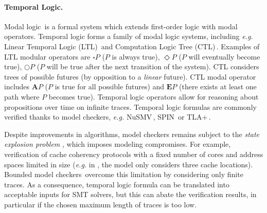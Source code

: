 
\paragraph{Temporal Logic.}
%
Modal logic\,\cite{chagrov1997modal} is a formal system which extends
first-order logic with modal operators.
%
Temporal logic forms a family of modal logic systems, including \emph{e.g.}
Linear Temporal Logic (LTL)\,\cite{sistla1985ltl} and Computation Logic Tree
(CTL)\,\cite{clarke1981ctl}.
%
Examples of LTL modular operators are \( \square P \) (\( P \) is always true),
\( \Diamond P \) (\( P \) will eventually become true), \( \bigcirc P \)
(\( P \) will be true after the next transition of the system).
%
CTL considers trees of possible futures (by opposition to a \emph{linear}
future).
%
CTL modal operator includes \( \mathbf{A} P \) (\( P \) is true for all possible
futures) and \( \mathbf{E} P \) (there exists at least one path where \( P \)
becomes true).
%
Temporal logic operators allow for reasoning about propositions over time on
infinite traces.
%
Temporal logic formulas are commonly verified thanks to model checkers,
\emph{e.g.}  NuSMV\,\cite{cimatti2002nusmv}, SPIN\,\cite{holzmann1997spin} or
TLA+\,\cite{lamport2002tla}.

Despite improvements in algorithms, model checkers remains subject to the
\emph{state explosion problem} , which imposes modeling compromises. For example, verification of cache coherency protocols with a fixed number of cores and
address spaces limited in size (\emph{e.g.} in \cite{lie2003xom}, the model only
considers three cache locations). 
%
%
Bounded model checkers\,\cite{biere2003bounded} overcome this limitation by considering only finite
traces.
%
As a consequence, temporal logic formula can be translated into acceptable
inputs for SMT solvers, but this can abate the verification results, in
particular if the chosen maximum length of traces is too low. 

